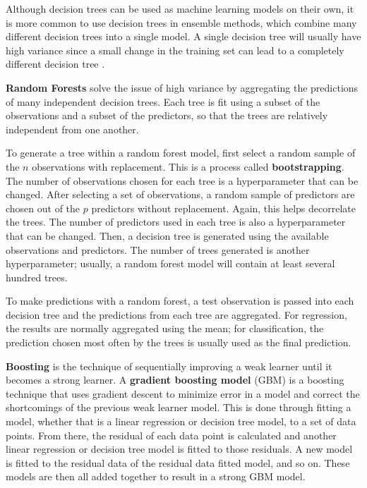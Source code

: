 \documentclass{article}
\begin{document}
Although decision trees can be used as machine learning models on their own, it is more common to use decision trees in ensemble methods, which combine many different decision trees into a single model. A single decision tree will usually have high variance since a small change in the training set can lead to a completely different decision tree \cite{james2013introduction}.

\textbf{Random Forests} solve the issue of high variance by aggregating the predictions of many independent decision trees. Each tree is fit using a subset of the observations and a subset of the predictors, so that the trees are relatively independent from one another.

To generate a tree within a random forest model, first select a random sample of the $n$ observations with replacement. This is a process called \textbf{bootstrapping}. The number of observations chosen for each tree is a hyperparameter that can be changed. After selecting a set of observations, a random sample of predictors are chosen out of the $p$ predictors without replacement. Again, this helps decorrelate the trees. The number of predictors used in each tree is also a hyperparameter that can be changed. Then, a decision tree is generated using the available observations and predictors. The number of trees generated is another hyperparameter; usually, a random forest model will contain at least several hundred trees.

To make predictions with a random forest, a test observation is passed into each decision tree and the predictions from each tree are aggregated. For regression, the results are normally aggregated using the mean; for classification, the prediction chosen most often by the trees is usually used as the final prediction.

\textbf{Boosting} is the technique of sequentially improving a weak learner until it becomes a strong learner. A \textbf{gradient boosting model} (GBM) is a boosting technique that uses gradient descent to minimize error in a model and correct the shortcomings of the previous weak learner model. This is done through fitting a model, whether that is a linear regression or decision tree model, to a set of data points. From there, the residual of each data point is calculated and another linear regression or decision tree model is fitted to those residuals. A new model is fitted to the residual data of the residual data fitted model, and so on. These models are then all added together to result in a strong GBM model.
\end{document}
